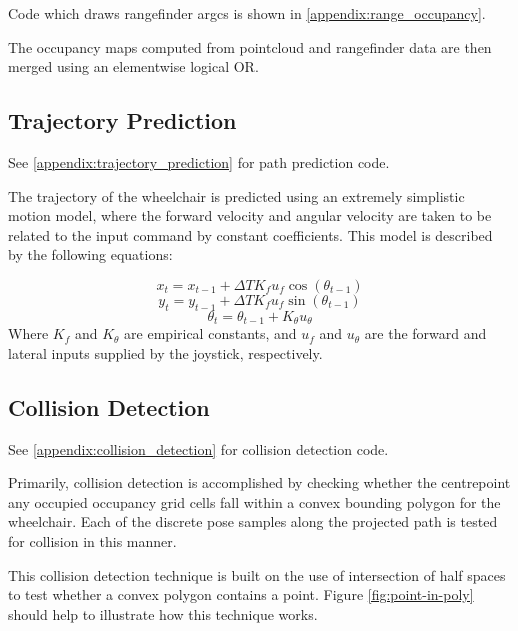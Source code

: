\documentclass[oneside,final,a4paper]{report}
\begin{document}
Code which draws rangefinder argcs is shown in \ref{appendix:range_occupancy}.

The occupancy maps computed from pointcloud and rangefinder data are then merged using an elementwise logical OR.

\subsection{Trajectory Prediction}
\label{section:trajectory_prediction}
See \ref{appendix:trajectory_prediction} for path prediction code.

The trajectory of the wheelchair is predicted using an extremely simplistic motion model, where the forward velocity and angular velocity are taken to be related to the input command by constant coefficients.  This model is described by the following equations:

\begin{equation}
x_t = x_{t-1} + \Delta T K_f u_f \cos (\theta_{t-1})
\end{equation}
\begin{equation}
y_t = y_{t-1} + \Delta T K_f u_f \sin (\theta_{t-1})
\end{equation}
\begin{equation}
\theta_t = \theta_{t-1} + K_{\theta} u_{\theta}
\end{equation}
Where $K_f$ and $K_\theta$ are empirical constants, and $u_f$ and $u_\theta$ are the forward and lateral inputs supplied by the joystick, respectively.

\subsection{Collision Detection}
\label{section:collision_detection}
See \ref{appendix:collision_detection} for collision detection code.

Primarily, collision detection is accomplished by checking whether the centrepoint any occupied occupancy grid cells fall within a convex bounding polygon for the wheelchair.  Each of the discrete pose samples along the projected path is tested for collision in this manner.

This collision detection technique is built on the use of intersection of half spaces to test whether a convex polygon contains a point.  Figure \ref{fig:point-in-poly} should help to illustrate how this technique works.
\end{document}
